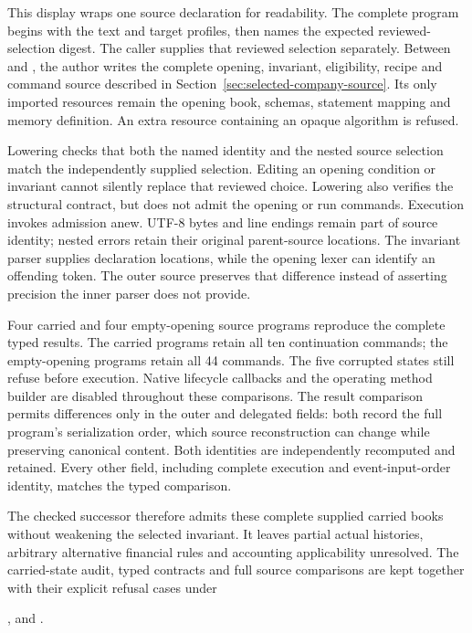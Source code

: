This display wraps one source declaration for readability. The complete
program begins with the text and target profiles, then names the expected
reviewed-selection digest. The caller supplies that reviewed selection
separately. Between  and
, the author writes the complete opening,
invariant, eligibility, recipe and command source described in
Section~\ref{sec:selected-company-source}. Its only imported resources remain
the opening book, schemas, statement mapping and memory definition. An extra
resource containing an opaque algorithm is refused.

Lowering checks that both the named identity and the nested source selection
match the independently supplied selection. Editing an opening condition or
invariant cannot silently replace that reviewed choice. Lowering also verifies
the structural contract, but does not admit the opening or run commands.
Execution invokes admission anew. UTF-8 bytes and line endings remain part of
source identity; nested errors retain their original parent-source locations.
The invariant parser supplies declaration locations, while the opening lexer
can identify an offending token. The outer source preserves that difference
instead of asserting precision the inner parser does not provide.

Four carried and four empty-opening source programs reproduce the complete
typed results. The carried programs retain all ten continuation commands;
the empty-opening programs retain all 44 commands. The five corrupted states
still refuse before execution. Native lifecycle callbacks and the operating
method builder are disabled throughout these comparisons. The result
comparison permits differences only in the outer and delegated
 fields: both record the full program's
serialization order, which source reconstruction can change while preserving
canonical content. Both identities are independently recomputed and retained.
Every other field, including complete execution and event-input-order identity,
matches the typed comparison.

The checked successor therefore admits these complete supplied carried books
without weakening the selected invariant. It leaves partial actual histories,
arbitrary alternative financial rules and accounting applicability unresolved.
The carried-state audit, typed contracts and full source comparisons are kept
together with their explicit refusal cases under
\begingroup\raggedright
{},
and .
\par\endgroup
